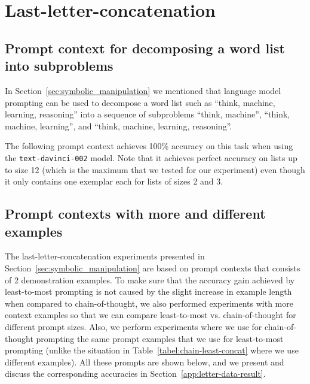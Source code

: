 \section{Last-letter-concatenation}
\label{app:letter}

\subsection{Prompt context for decomposing a word list into subproblems}
\label{app:letter-prompt-reduction}
In Section~\ref{sec:symbolic_manipulation} we mentioned that language model prompting can be used to decompose a word list such as ``think, machine, learning, reasoning'' into a sequence of subproblems ``think, machine'', ``think, machine, learning'', and ``think, machine, learning, reasoning''.

The following prompt context achieves 100\% accuracy on this task when using the \texttt{text-davinci-002} model. Note that it achieves perfect accuracy on lists up to size 12 (which is the maximum that we tested for our experiment) even though it only contains one exemplar each for lists of sizes 2 and 3.



\subsection{Prompt contexts with more and different examples}
\label{app:letter-double}
The last-letter-concatenation experiments presented in Section~\ref{sec:symbolic_manipulation} are based on prompt contexts that consists of 2 demonstration examples. To make sure that the accuracy gain achieved by least-to-most prompting is not caused by the slight increase in example length when compared to chain-of-thought, we also performed experiments with more context examples so that we can compare least-to-most vs. chain-of-thought for different prompt sizes. Also, we perform experiments where we use for chain-of-thought prompting the same prompt examples that we use for least-to-most prompting (unlike the situation in Table~\ref{tabel:chain-least-concat} where we use different examples). All these prompts are shown below, and we present and discuss the corresponding accuracies in Section~\ref{app:letter-data-result}.

